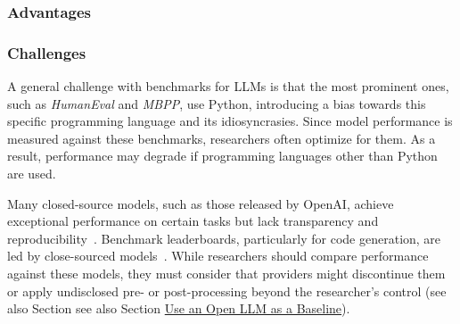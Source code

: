 

\subsubsection{Advantages}


\subsubsection{Challenges}

A general challenge with benchmarks for LLMs is that the most prominent ones, such as \emph{HumanEval} and \emph{MBPP}, use Python, introducing a bias towards this specific programming language and its idiosyncrasies.
Since model performance is measured against these benchmarks, researchers often optimize for them.
As a result, performance may degrade if programming languages other than Python are used.

Many closed-source models, such as those released by OpenAI, achieve exceptional performance on certain tasks but lack transparency and reproducibility~\cite{DBLP:conf/nips/00110ZZDJLHL24, DBLP:journals/corr/abs-2308-01861, DBLP:journals/corr/abs-2406-15877}.
Benchmark leaderboards, particularly for code generation, are led by close-sourced models~\cite{DBLP:journals/corr/abs-2308-01861, DBLP:journals/corr/abs-2406-15877}.
While researchers should compare performance against these models, they must consider that providers might discontinue them or apply undisclosed pre- or post-processing beyond the researcher's control (see also Section see also Section \href{/guidelines/#use-an-open-llm-as-a-baseline}{Use an Open LLM as a Baseline}).

